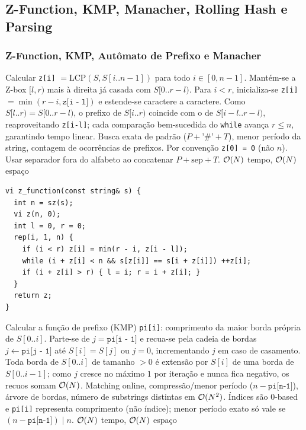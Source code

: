 \subsection{Z-Function, KMP, Manacher, Rolling Hash e Parsing}

\subsubsection{Z-Function, KMP, Autômato de Prefixo e Manacher}
\algobox
  {Calcular \texttt{z[i]} $= \text{LCP}(S, S[i..n-1])$ para todo $i \in [0, n-1]$.}
  {Mantém-se a Z-box $[l, r)$ mais à direita já casada com $S[0..r-l)$. Para $i < r$, inicializa-se \texttt{z[i]} $= \min(r - i, \texttt{z[i - l]})$ e estende-se caractere a caractere.}
  {Como $S[l..r) = S[0..r-l)$, o prefixo de $S[i..r)$ coincide com o de $S[i-l..r-l)$, reaproveitando \texttt{z[i-l]}; cada comparação bem-sucedida do \texttt{while} avança $r \le n$, garantindo tempo linear.}
  {Busca exata de padrão ($P + \text{'\#'} + T$), menor período da string, contagem de ocorrências de prefixos.}
  {Por convenção \texttt{z[0] = 0} (não $n$). Usar separador fora do alfabeto ao concatenar $P + \text{sep} + T$.}
  {$\mathcal{O}(N)$ tempo, $\mathcal{O}(N)$ espaço}

\begin{lstlisting}
vi z_function(const string& s) {
  int n = sz(s);
  vi z(n, 0);
  int l = 0, r = 0;
  rep(i, 1, n) {
    if (i < r) z[i] = min(r - i, z[i - l]);
    while (i + z[i] < n && s[z[i]] == s[i + z[i]]) ++z[i];
    if (i + z[i] > r) { l = i; r = i + z[i]; }
  }
  return z;
}
\end{lstlisting}

\algobox
  {Calcular a função de prefixo (KMP) \texttt{pi[i]}: comprimento da maior borda própria de $S[0..i]$.}
  {Parte-se de $j = \texttt{pi[i - 1]}$ e recua-se pela cadeia de bordas $j \leftarrow \texttt{pi[j - 1]}$ até $S[i] = S[j]$ ou $j = 0$, incrementando $j$ em caso de casamento.}
  {Toda borda de $S[0..i]$ de tamanho $> 0$ é extensão por $S[i]$ de uma borda de $S[0..i-1]$; como $j$ cresce no máximo $1$ por iteração e nunca fica negativo, os recuos somam $\mathcal{O}(N)$.}
  {Matching online, compressão/menor período ($n - \texttt{pi[n-1]}$), árvore de bordas, número de substrings distintas em $\mathcal{O}(N^2)$.}
  {Índices são 0-based e \texttt{pi[i]} representa comprimento (não índice); menor período exato só vale se $(n - \texttt{pi[n-1]}) \mid n$.}
  {$\mathcal{O}(N)$ tempo, $\mathcal{O}(N)$ espaço}

